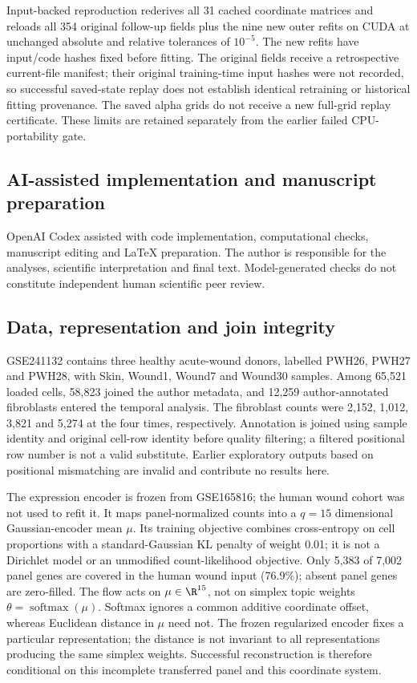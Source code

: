 \documentclass[10pt,a4paper]{article}
\begin{document}
Input-backed reproduction rederives all 31 cached coordinate matrices and reloads all 354 original follow-up fields plus the nine new outer refits on CUDA at unchanged absolute and relative tolerances of $10^{-5}$. The new refits have input/code hashes fixed before fitting. The original fields receive a retrospective current-file manifest; their original training-time input hashes were not recorded, so successful saved-state replay does not establish identical retraining or historical fitting provenance. The saved alpha grids do not receive a new full-grid replay certificate. These limits are retained separately from the earlier failed CPU-portability gate.

\subsection{AI-assisted implementation and manuscript preparation}
OpenAI Codex assisted with code implementation, computational checks, manuscript editing and LaTeX preparation. The author is responsible for the analyses, scientific interpretation and final text. Model-generated checks do not constitute independent human scientific peer review.

\subsection{Data, representation and join integrity}
GSE241132 contains three healthy acute-wound donors, labelled PWH26, PWH27 and PWH28, with Skin, Wound1, Wound7 and Wound30 samples. Among 65,521 loaded cells, 58,823 joined the author metadata, and 12,259 author-annotated fibroblasts entered the temporal analysis. The fibroblast counts were 2,152, 1,012, 3,821 and 5,274 at the four times, respectively. Annotation is joined using sample identity and original cell-row identity before quality filtering; a filtered positional row number is not a valid substitute. Earlier exploratory outputs based on positional mismatching are invalid and contribute no results here.

The expression encoder is frozen from GSE165816; the human wound cohort was not used to refit it. It maps panel-normalized counts into a $q=15$ dimensional Gaussian-encoder mean $\mu$. Its training objective combines cross-entropy on cell proportions with a standard-Gaussian KL penalty of weight 0.01; it is not a Dirichlet model or an unmodified count-likelihood objective. Only 5,383 of 7,002 panel genes are covered in the human wound input (76.9\%); absent panel genes are zero-filled. The flow acts on $\mu\in\R^{15}$, not on simplex topic weights $\theta=\operatorname{softmax}(\mu)$. Softmax ignores a common additive coordinate offset, whereas Euclidean distance in $\mu$ need not. The frozen regularized encoder fixes a particular representation; the distance is not invariant to all representations producing the same simplex weights. Successful reconstruction is therefore conditional on this incomplete transferred panel and this coordinate system.
\end{document}
